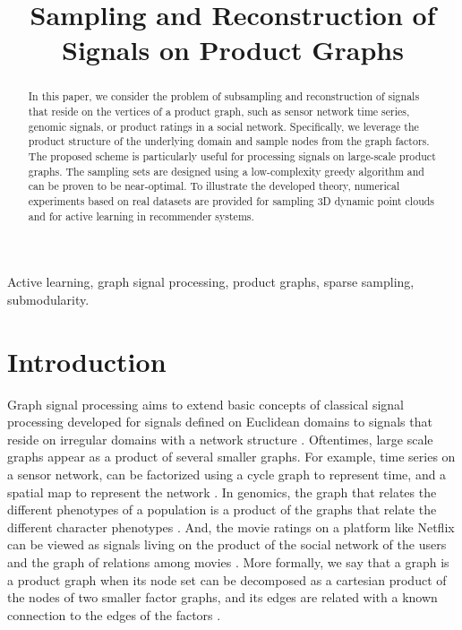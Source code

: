 \documentclass{article}
\begin{document}
\ninept

\title{Sampling and Reconstruction of Signals on Product Graphs}
\address{Delft University of Technology, The Netherlands}

%
%
%
%
%
%
%
%
%
%
%
%
%
%
%
%
%
%
%
%
%
%
%
%

\maketitle

\begin{abstract}
In this paper, we consider the problem of subsampling and reconstruction of signals that reside on the vertices of a product graph, such as sensor network time series, genomic signals, or product ratings in a social network. Specifically, we leverage the product structure of the underlying domain and sample nodes from the graph factors. The proposed scheme is particularly useful for processing signals on large-scale product graphs. The sampling sets are designed using a low-complexity greedy algorithm and can be proven to be near-optimal. To illustrate the developed theory, numerical experiments based on real datasets are provided for sampling 3D dynamic point clouds and for active learning in recommender systems.
\end{abstract}

\begin{keywords}
Active learning, graph signal processing, product graphs, sparse sampling, submodularity.
\end{keywords}


\section{Introduction}

Graph signal processing aims to extend basic concepts of classical signal processing developed for signals defined on Euclidean domains to signals that reside on irregular domains with a network structure \cite{gsp}. Oftentimes, large scale graphs appear as a product of several smaller graphs. For example, time series on a sensor network, can be factorized using a cycle graph to represent time, and a spatial map to represent the network \cite{jtv}. In genomics, the graph that relates the different phenotypes of a population is a product of the graphs that relate the different character phenotypes \cite{phenotype}. And, the movie ratings on a platform like Netflix can be viewed as signals living on the product of the social network of the users and the graph of relations among movies \cite{netflix}. More formally, we say that a graph is a product graph when its node set can be decomposed as a cartesian product of the nodes of two smaller factor graphs, and its edges are related with a known connection to the edges of the factors \cite{graph_theory}.
\end{document}
